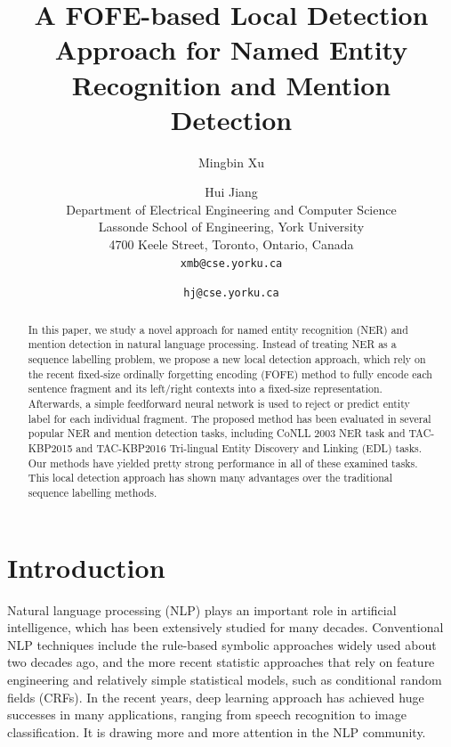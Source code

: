 \documentclass[11pt,a4paper]{article}
\title{A FOFE-based Local Detection Approach for Named Entity Recognition and Mention Detection}
\author{Mingbin Xu \and Hui Jiang \\
	Department of Electrical Engineering and Computer Science \\
	Lassonde School of Engineering, York University \\
	4700 Keele Street, Toronto, Ontario, Canada\\
	{\tt xmb@cse.yorku.ca} \and  {\tt hj@cse.yorku.ca}  
}
\date{}
\begin{document}
\maketitle

\begin{abstract}
	In this paper, we study a novel approach for named entity recognition (NER) and mention detection in natural language processing. Instead of treating NER as a sequence labelling problem, we propose a new local detection approach, which rely on the recent fixed-size ordinally forgetting encoding (FOFE) method to fully encode each sentence fragment and its left/right contexts into a fixed-size representation. Afterwards, a simple feedforward neural network is used to reject or predict entity label for each individual fragment. The proposed method has been evaluated in several popular NER and mention detection tasks, including CoNLL 2003 NER task and  TAC-KBP2015 and TAC-KBP2016 Tri-lingual Entity Discovery and Linking (EDL) tasks. Our methods have yielded pretty strong performance in all of these examined tasks. This local detection approach has shown many advantages over the traditional sequence labelling  methods.
\end{abstract}


\section{Introduction}

Natural language processing (NLP) plays an important role in artificial intelligence, which has been extensively studied for many decades. Conventional NLP techniques include the rule-based symbolic approaches widely used about two decades ago, and the more recent statistic approaches that rely on feature engineering and relatively simple statistical models, such as conditional random fields (CRFs). In the recent years, deep learning approach has achieved huge successes in many applications, ranging from speech recognition to image classification. It is drawing more and more attention in the NLP community. 
\end{document}
